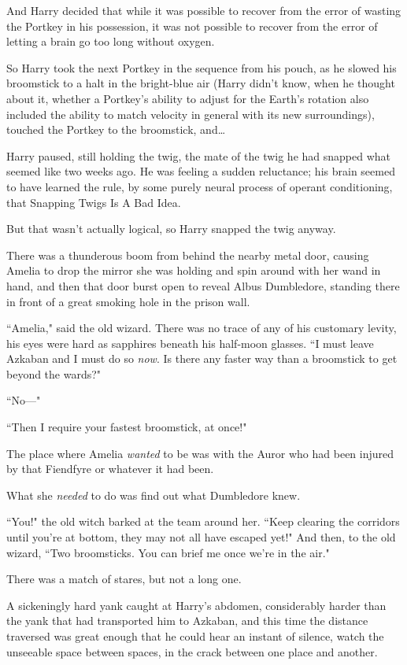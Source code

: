 And Harry decided that while it was possible to recover from the error of wasting the Portkey in his possession, it was not possible to recover from the error of letting a brain go too long without oxygen.

So Harry took the next Portkey in the sequence from his pouch, as he slowed his broomstick to a halt in the bright-blue air (Harry didn't know, when he thought about it, whether a Portkey's ability to adjust for the Earth's rotation also included the ability to match velocity in general with its new surroundings), touched the Portkey to the broomstick, and{\ldots}

Harry paused, still holding the twig, the mate of the twig he had snapped what seemed like two weeks ago. He was feeling a sudden reluctance; his brain seemed to have learned the rule, by some purely neural process of operant conditioning, that Snapping Twigs Is A Bad Idea.

But that wasn't actually logical, so Harry snapped the twig anyway.

\later

There was a thunderous boom from behind the nearby metal door, causing Amelia to drop the mirror she was holding and spin around with her wand in hand, and then that door burst open to reveal Albus Dumbledore, standing there in front of a great smoking hole in the prison wall.

``Amelia," said the old wizard. There was no trace of any of his customary levity, his eyes were hard as sapphires beneath his half-moon glasses. ``I must leave Azkaban and I must do so \emph{now}. Is there any faster way than a broomstick to get beyond the wards?"

``No---"

``Then I require your fastest broomstick, at once!"

The place where Amelia \emph{wanted} to be was with the Auror who had been injured by that Fiendfyre or whatever it had been.

What she \emph{needed} to do was find out what Dumbledore knew.

``You!" the old witch barked at the team around her. ``Keep clearing the corridors until you're at bottom, they may not all have escaped yet!" And then, to the old wizard, ``Two broomsticks. You can brief me once we're in the air."

There was a match of stares, but not a long one.

\later

A sickeningly hard yank caught at Harry's abdomen, considerably harder than the yank that had transported him to Azkaban, and this time the distance traversed was great enough that he could hear an instant of silence, watch the unseeable space between spaces, in the crack between one place and another.

